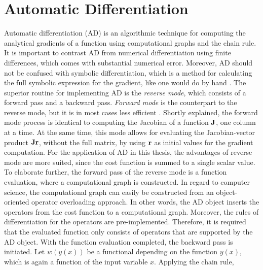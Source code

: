 

\section{Automatic Differentiation}\label{sec:theory_AD}
\noindent
Automatic differentiation (AD) is an algorithmic technique for computing the analytical gradients of a function using computational graphs and the chain rule.
It is important to contrast AD from numerical differentiation using finite differences, which comes with substantial numerical error.
Moreover, AD should not be confused with symbolic differentiation, which is a method for calculating the full symbolic expression for the gradient, like one would do by hand \cite{baydin2018automatic}.
The superior routine for implementing AD is the \emph{reverse mode}, which consists of a forward pass and a backward pass.
\emph{Forward mode} is the counterpart to the reverse mode, but it is in most cases less efficient \cite{baydin2018automatic}.
Shortly explained, the forward mode process is identical to computing the Jacobian of a function $\bm{\mathrm{J}}$, one column at a time.
At the same time, this mode allows for evaluating the Jacobian-vector product $\bm{\mathrm{Jr}}$, without the full matrix, by using $\bm{\mathrm{r}}$ as initial values for the gradient computation.
For the application of AD in this thesis, the advantages of reverse mode are more suited, since the cost function is summed to a single scalar value.
To elaborate further, the forward pass of the reverse mode is a function evaluation, where a computational graph is constructed.
In regard to computer science, the computational graph can easily be constructed from an object-oriented operator overloading approach.
In other words, the AD object inserts the operators from the cost function to a computational graph.
Moreover, the rules of differentiation for the operators are pre-implemented.
Therefore, it is required that the evaluated function only consists of operators that are supported by the AD object.
With the function evaluation completed, the backward pass is initiated.
Let $w(y(x))$ be a functional depending on the function $y(x)$, which is again a function of the input variable $x$. Applying the chain rule,

